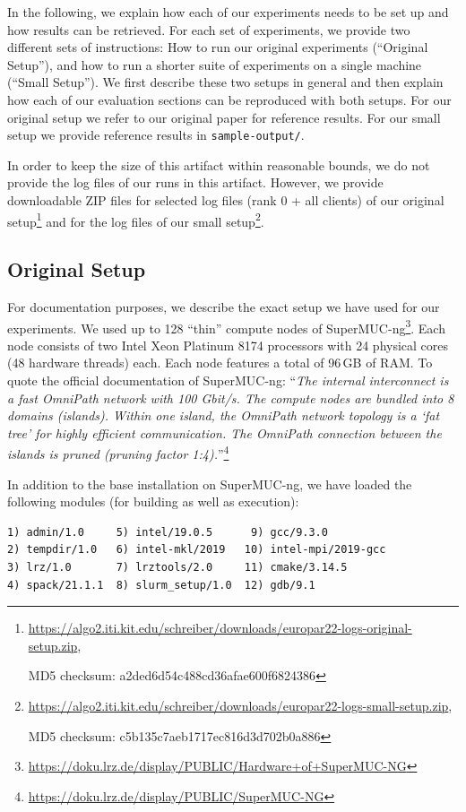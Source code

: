 \documentclass[runningheads]{article}
\numberwithin{dummy}{subsection}
\begin{document}
In the following, we explain how each of our experiments needs to be set up and how results can be retrieved.
For each set of experiments, we provide two different sets of instructions: How to run our original experiments (``Original Setup''), and how to run a shorter suite of experiments on a single machine (``Small Setup'').
We first describe these two setups in general and then explain how each of our evaluation sections can be reproduced with both setups.
For our original setup we refer to our original paper for reference results.
For our small setup we provide reference results in \texttt{sample-output/}.

In order to keep the size of this artifact within reasonable bounds, we do not provide the log files of our runs in this artifact.
However, we provide downloadable ZIP files for selected log files (rank 0 + all clients) of our original setup\footnote{\url{https://algo2.iti.kit.edu/schreiber/downloads/europar22-logs-original-setup.zip},

\hspace*{0.4cm}MD5 checksum: a2ded6d54c488cd36afae600f6824386} and for the log files of our small setup\footnote{\url{https://algo2.iti.kit.edu/schreiber/downloads/europar22-logs-small-setup.zip}, 

\hspace*{0.4cm}MD5 checksum: c5b135c7aeb1717ec816d3d702b0a886}.

\subsection{Original Setup}
\label{sec:original-setup}

For documentation purposes, we describe the exact setup we have used for our experiments.
We used up to 128 ``thin'' compute nodes of SuperMUC-ng\footnote{\url{https://doku.lrz.de/display/PUBLIC/Hardware+of+SuperMUC-NG}}.
Each node consists of two Intel Xeon Platinum 8174 processors with 24 physical cores (48 hardware threads) each.
Each node features a total of 96\,GB of RAM.
To quote the official documentation of SuperMUC-ng: ``\textit{The internal interconnect is a fast OmniPath network with 100 Gbit/s.
The compute nodes are bundled into 8 domains (islands). Within one island, the OmniPath network topology is a `fat tree' for highly efficient communication. The OmniPath connection between the islands is pruned (pruning factor 1:4).}''\footnote{\url{https://doku.lrz.de/display/PUBLIC/SuperMUC-NG}}

In addition to the base installation on SuperMUC-ng, we have loaded the following modules (for building as well as execution):
{
\begin{verbatim}
1) admin/1.0     5) intel/19.0.5      9) gcc/9.3.0           
2) tempdir/1.0   6) intel-mkl/2019   10) intel-mpi/2019-gcc  
3) lrz/1.0       7) lrztools/2.0     11) cmake/3.14.5        
4) spack/21.1.1  8) slurm_setup/1.0  12) gdb/9.1    
\end{verbatim}
}
\end{document}

